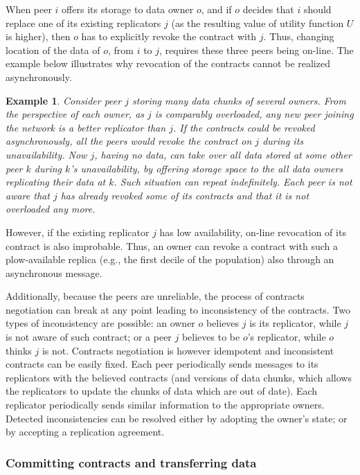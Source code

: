 \documentclass[10pt, final, conference, letterpaper]{IEEEtran}
\newtheorem{example}{Example}
\begin{document}
When peer $i$ offers its storage to data owner $o$, and if $o$ decides that $i$ should replace one of its existing replicators $j$ (as the resulting value of utility function $U$ is higher), then $o$ has to explicitly revoke the contract with $j$. Thus, changing location of the data of $o$, from $i$ to $j$, requires these three peers being on-line. The example below illustrates why revocation of the contracts cannot be realized asynchronously. 

\begin{example}
Consider peer $j$ storing many data chunks of several owners. From the perspective of each owner, as $j$ is comparably overloaded, any new peer joining the network is a better replicator than $j$. If the contracts could be revoked asynchronously, all the peers would revoke the contract on $j$ during its unavailability. Now $j$, having no data, can take over all data stored at some other peer $k$ during $k$'s unavailability, by offering storage space to the all data owners replicating their data at $k$. Such situation can repeat indefinitely. Each peer is not aware that $j$ has already revoked some of its contracts and that it is not overloaded any more.
\end{example}

However, if the existing replicator $j$ has low availability, on-line revocation of its contract is also improbable. Thus, an owner can revoke a contract with such a plow-available replica (e.g., the first decile of the population) also through an asynchronous message.

Additionally, because the peers are unreliable, the process of contracts negotiation can break at any point leading to inconsistency of the contracts. Two types of inconsistency are possible: an owner $o$ believes $j$ is its replicator, while $j$ is not aware of such contract; or a peer $j$ believes to be $o$'s replicator, while $o$ thinks $j$ is not. Contracts negotiation is however idempotent and inconsistent contracts can be easily fixed. Each peer periodically sends messages to its replicators with the believed contracts (and versions of data chunks, which allows the replicators to update the chunks of data which are out of date). Each replicator periodically sends similar information to the appropriate owners. Detected inconsistencies can be resolved either by adopting the owner's state; or by accepting a replication agreement.

\subsubsection{Committing contracts and transferring data}
\end{document}
